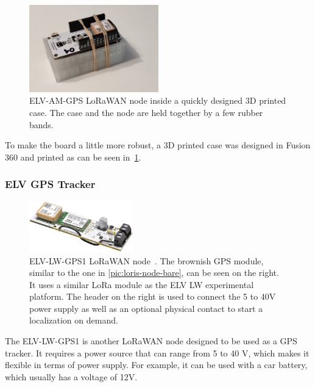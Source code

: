 \begin{figure}[htbp]
    \centering
    \includegraphics[width=0.5\textwidth]{pictures/hardware/gps-nodes/loris_with_case.jpg}
    \caption{
        ELV-AM-GPS \ac{LoRaWAN} node inside a quickly designed 3D printed case.
        The case and the node are held together by a few rubber bands.
    }\label{pic:loris-node-with-case}
\end{figure}

To make the board a little more robust, a 3D printed case was designed in Fusion 360 and printed as can be seen in~\cref{pic:loris-node-with-case}.

\subsubsection{ELV \acs{GPS} Tracker}\label{subsubsec:elv-gps-tracker-implementation}

\begin{figure}[htbp]
    \centering
    \includegraphics[width=0.4\textwidth]{pictures/hardware/gps-nodes/ELV-LW-GPS1.jpg}
    \caption{
        ELV-LW-GPS1 \ac{LoRaWAN} node~\protect\cite{elv_elektronik_ag_elv_2023}.
        The brownish \ac{GPS} module, similar to the one in \cref{pic:loris-node-bare}, can be seen on the right.
        It uses a similar \ac{LoRa} module as the ELV LW experimental platform.
        The header on the right is used to connect the 5 to 40V power supply as well as an optional physical contact to start a localization on demand.
    }
\end{figure}

The ELV-LW-GPS1 is another \ac{LoRaWAN} node designed to be used as a \ac{GPS} tracker.
It requires a power source that can range from 5 to 40 V, which makes it flexible in terms of power supply.
For example, it can be used with a car battery, which usually has a voltage of 12V.

